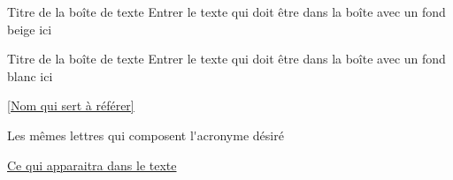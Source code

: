 





\begin{textbox_parchemin}{Titre de la boîte de texte}
    Entrer le texte qui doit être dans la boîte avec un fond beige ici
\end{textbox_parchemin}

\begin{textbox_blanc}{Titre de la boîte de texte}
    Entrer le texte qui doit être dans la boîte avec un fond blanc ici
\end{textbox_blanc}







\label{Non qui servira à référer}

\ref{Nom qui sert à référer} 


\ac{Les mêmes lettres qui composent l'acronyme désiré} 

\href{www.URL.com}{Ce qui apparaitra dans le texte}









